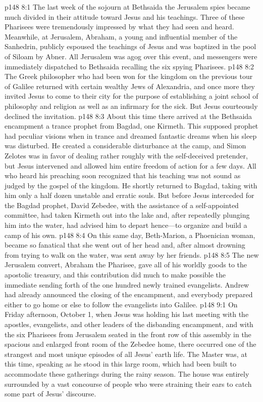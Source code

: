 \vs p148 8:1 The last week of the sojourn at Bethsaida the Jerusalem spies became much divided in their attitude toward Jesus and his teachings. Three of these Pharisees were tremendously impressed by what they had seen and heard. Meanwhile, at Jerusalem, Abraham, a young and influential member of the Sanhedrin, publicly espoused the teachings of Jesus and was baptized in the pool of Siloam by Abner. All Jerusalem was agog over this event, and messengers were immediately dispatched to Bethsaida recalling the six spying Pharisees.
\pc \vs p148 8:2 The Greek philosopher who had been won for the kingdom on the previous tour of Galilee returned with certain wealthy Jews of Alexandria, and once more they invited Jesus to come to their city for the purpose of establishing a joint school of philosophy and religion as well as an infirmary for the sick. But Jesus courteously declined the invitation.
\pc \vs p148 8:3 About this time there arrived at the Bethsaida encampment a trance prophet from Bagdad, one Kirmeth. This supposed prophet had peculiar visions when in trance and dreamed fantastic dreams when his sleep was disturbed. He created a considerable disturbance at the camp, and Simon Zelotes was in favor of dealing rather roughly with the self\hyp{}deceived pretender, but Jesus intervened and allowed him entire freedom of action for a few days. All who heard his preaching soon recognized that his teaching was not sound as judged by the gospel of the kingdom. He shortly returned to Bagdad, taking with him only a half dozen unstable and erratic souls. But before Jesus interceded for the Bagdad prophet, David Zebedee, with the assistance of a self\hyp{}appointed committee, had taken Kirmeth out into the lake and, after repeatedly plunging him into the water, had advised him to depart hence---to organize and build a camp of his own.
\pc \vs p148 8:4 On this same day, Beth\hyp{}Marion, a Phoenician woman, became so fanatical that she went out of her head and, after almost drowning from trying to walk on the water, was sent away by her friends.
\pc \vs p148 8:5 The new Jerusalem convert, Abraham the Pharisee, gave all of his worldly goods to the apostolic treasury, and this contribution did much to make possible the immediate sending forth of the one hundred newly trained evangelists. Andrew had already announced the closing of the encampment, and everybody prepared either to go home or else to follow the evangelists into Galilee.
\vs p148 9:1 On Friday afternoon, October 1, when Jesus was holding his last meeting with the apostles, evangelists, and other leaders of the disbanding encampment, and with the six Pharisees from Jerusalem seated in the front row of this assembly in the spacious and enlarged front room of the Zebedee home, there occurred one of the strangest and most unique episodes of all Jesus’ earth life. The Master was, at this time, speaking as he stood in this large room, which had been built to accommodate these gatherings during the rainy season. The house was entirely surrounded by a vast concourse of people who were straining their ears to catch some part of Jesus’ discourse.
